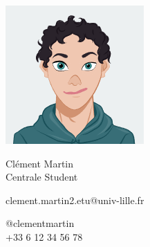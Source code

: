 \documentclass{article}
\begin{document}
\centering \includegraphics[width=.20\linewidth]{Avatar}\\[5pt]
\parbox{2in}{\Large \centering Clément Martin\\[1pt]
\normalsize Centrale Student}

\vfill
\raggedright
\begin{multicols}{2}
clement.martin2.etu@univ-lille.fr

\columnbreak
\raggedleft
@clementmartin\\
+33 6 12 34 56 78%
\end{multicols}%
\end{document}

